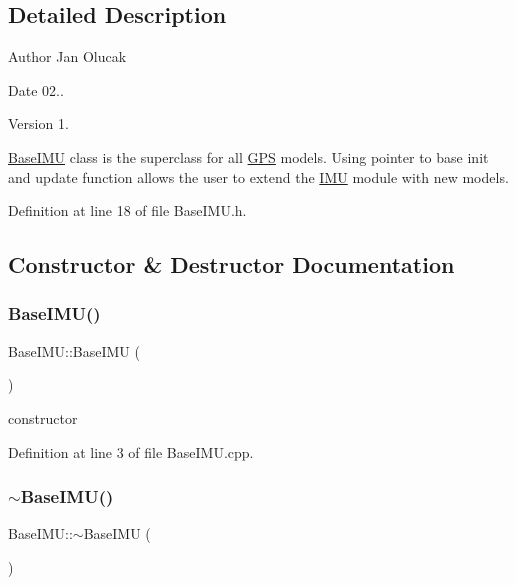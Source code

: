 \subsection{Detailed Description}
\begin{DoxyAuthor}{Author}
Jan Olucak 
\end{DoxyAuthor}
\begin{DoxyDate}{Date}
02.. 
\end{DoxyDate}
\begin{DoxyVersion}{Version}
1.
\end{DoxyVersion}
\hyperlink{class_base_i_m_u}{Base\+I\+MU} class is the superclass for all \hyperlink{class_g_p_s}{G\+PS} models. Using pointer to base init and update function allows the user to extend the \hyperlink{class_i_m_u}{I\+MU} module with new models. 

Definition at line 18 of file Base\+I\+M\+U.\+h.



\subsection{Constructor \& Destructor Documentation}
\mbox{\label{class_base_i_m_u_a83201acc90b4dad87a64f0196ec9e282}} 
\subsubsection{\texorpdfstring{Base\+I\+M\+U()}{BaseIMU()}}
{\footnotesize\ttfamily Base\+I\+M\+U\+::\+Base\+I\+MU (\begin{DoxyParamCaption}{ }\end{DoxyParamCaption})}



constructor 



Definition at line 3 of file Base\+I\+M\+U.\+cpp.

\mbox{\label{class_base_i_m_u_ae986c3e646b24fc8d58faf6ae72e3841}} 
\subsubsection{\texorpdfstring{$\sim$\+Base\+I\+M\+U()}{~BaseIMU()}}
{\footnotesize\ttfamily Base\+I\+M\+U\+::$\sim$\+Base\+I\+MU (\begin{DoxyParamCaption}{ }\end{DoxyParamCaption})}




